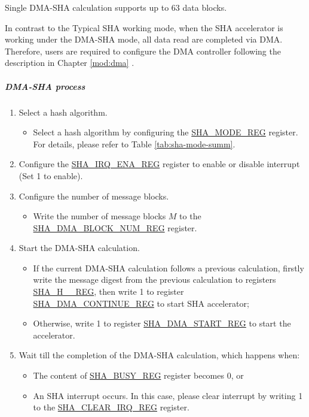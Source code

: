 \documentclass[main\_\_EN.tex]{subfiles}
\begin{document}
Single DMA-SHA calculation supports up to 63 data blocks.

In contrast to the Typical SHA working mode, when the SHA accelerator is working under the DMA-SHA mode, all data read are completed via DMA. Therefore, users are required to configure the DMA controller following the description in Chapter \ref{mod:dma} \textit{}.

\subparagraph{DMA-SHA process}

\begin{enumerate}
    \item Select a hash algorithm.
    \begin{itemize}
        \item Select a hash algorithm by configuring the \hyperref[regdesc:SHAMODEREG]{SHA\_MODE\_REG} register. For details, please refer to Table \ref{tab:sha-mode-summ}.
    \end{itemize}
    \item Configure the \hyperref[regdesc:SHAIRQENAREG]{SHA\_IRQ\_ENA\_REG} register to enable or disable interrupt (Set 1 to enable).
    \item Configure the number of message blocks.
    \begin{itemize}
        \item  Write the number of message blocks \begin{math}M\end{math} to the  \hyperref[regdesc:SHADMABLOCKNUMREG]{SHA\_DMA\_BLOCK\_NUM\_REG} register.
    \end{itemize}
    \item Start the DMA-SHA calculation.
        \begin{itemize}
            \item If the current DMA-SHA calculation follows a previous calculation, firstly write the message digest from the previous calculation to registers \hyperref[regdesc:SHAHNREG]{SHA\_H\_\_REG}, then write 1 to register \hyperref[regdesc:SHADMACONTINUEREG]{SHA\_DMA\_CONTINUE\_REG} to start SHA accelerator;
            \item Otherwise, write 1 to register \hyperref[regdesc:SHADMASTARTREG]{SHA\_DMA\_START\_REG} to start the accelerator.
        \end{itemize}
    \item Wait till the completion of the DMA-SHA calculation, which happens when:
        \begin{itemize}
            \item The content of \hyperref[regdesc:SHABUSYREG]{SHA\_BUSY\_REG} register becomes 0, or
            \item An SHA interrupt occurs. In this case, please clear interrupt by writing 1 to the \hyperref[regdesc:SHACLEARIRQREG]{SHA\_CLEAR\_IRQ\_REG} register.
        \end{itemize}
    

\end{enumerate}
\end{document}
